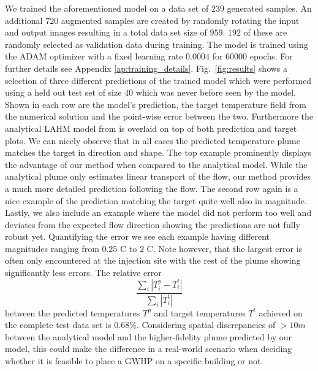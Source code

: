 \documentclass{article} %
\begin{document}

We trained the aforementioned model on a data set of $239$ generated samples. An additional $720$ augmented samples are created by randomly rotating the input and output images resulting in a total data set size of $959$. $192$ of these are randomly selected as validation data during training.
The model is trained using the ADAM optimizer \citep{adam} with a fixed learning rate $0.0004$ for $60000$ epochs.
For further details see Appendix \ref{ap:training_details}.
Fig.~\ref{fig:results} shows a selection of three different predictions of the trained model which were performed using a held out test set of size $40$ which was never before seen by the model.
Shown in each row are the model's prediction, the target temperature field from the numerical solution and the point-wise error between the two.
Furthermore the analytical LAHM model from \citet{Pophillat2020} is overlaid on top of both prediction and target plots.
We can nicely observe that in all cases the predicted temperature plume matches the target in direction and shape.
The top example prominently displays the advantage of our method when compared to the analytical model.
While the analytical plume only estimates linear transport of the flow, our method provides a much more detailed prediction following the flow.
The second row again is a nice example of the prediction matching the target quite well also in magnitude.
Lastly, we also include an example where the model did not perform too well and deviates from the expected flow direction showing the predictions are not fully robust yet.
Quantifying the error we see each example having different magnitudes ranging from $0.25$ \degree C to $2$ \degree C.
Note however, that the largest error is often only encountered at the injection site with the rest of the plume showing significantly less errors.
The relative error
\begin{equation*}
    \frac{\sum_i \left| T^p_i - T^t_i \right|}{\sum_i \left| T^t_i \right|}
\end{equation*}
between the predicted temperatures $T^p$ and target temperatures $T^t$ achieved on the complete test data set is $0.68 \%$.
Considering spatial discrepancies of $>10m$ between the analytical model and the higher-fidelity plume predicted by our model, this could make the difference in a real-world scenario when deciding whether it is feasible to place a GWHP on a specific building or not.
\end{document}
